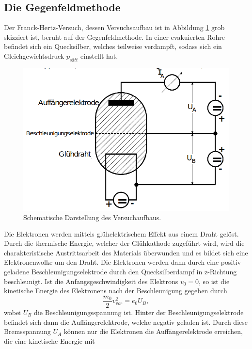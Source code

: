 \subsection{Die Gegenfeldmethode}
\label{sec:gegen}
Der Franck-Hertz-Versuch, dessen Versuchsaufbau ist in Abbildung \ref{fig:skizze} grob skizziert ist, beruht auf der Gegenfeldmethode.
In einer evakuierten Rohre befindet sich ein Quecksilber, welches teilweise verdampft, sodass sich ein Gleichgewichtsdruck $p_{sätt}$ 
einstellt hat. 
\begin{figure}[H]
    \centering
    \includegraphics[scale = 0.5]{pictures/Aufbau1.png}
    \caption{Schematische Darstellung des Versuchaufbaus. \cite{AP01}}
    \label{fig:skizze}
\end{figure}
Die Elektronen werden mittels glühelektrischem Effekt aus einem Draht gelöst. Durch die thermische Energie, welcher der 
Glühkathode zugeführt wird, wird die charakteristische Austrittsarbeit des Materials überwunden und es bildet sich eine Elektronenwolke
um den Draht. Die Elektronen werden dann durch eine positiv geladene Beschleunigungselektrode durch den Quecksilberdampf in 
z-Richtung beschleunigt. Ist die Anfangsgeschwindigkeit des Elektrons $v_0=0$, so ist die kinetische Energie des Elektronens nach der 
Beschleunigung gegeben durch
\begin{equation*}
    \frac{m_0}{2}v_{vor}^2=e_0U_B   ,
\end{equation*}
wobei $U_B$ die Beschleunigungsspannung ist.
Hinter der Beschleunigungselektrode befindet sich dann die Auffängerelektrode, welche negativ geladen ist. Durch diese Bremsspannung
$U_A$ können nur die Elektronen die Auffängerelektrode erreichen, die eine kinetische Energie mit  
